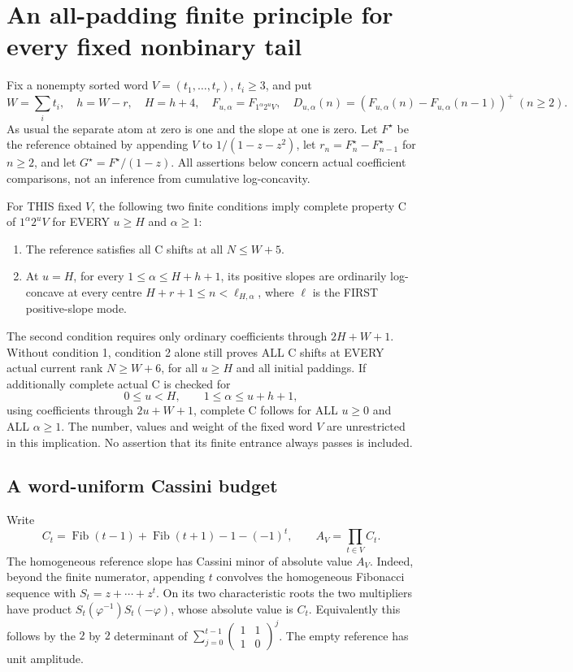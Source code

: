 \section{An all-padding finite principle for every fixed nonbinary tail}
Fix a nonempty sorted word $V=(t_1,\ldots,t_r)$, $t_i\ge3$, and put
\[
 W=\sum_i t_i,\quad h=W-r,\quad H=h+4,\quad
 F_{u,\alpha}=F_{1^\alpha2^u V},\quad
 D_{u,\alpha}(n)=(F_{u,\alpha}(n)-F_{u,\alpha}(n-1))^+\ (n\ge2).
\]
As usual the separate atom at zero is one and the slope at one is zero.
Let $F^\star$ be the reference obtained by appending $V$ to
$1/(1-z-z^2)$, let $r_n=F^\star_n-F^\star_{n-1}$ for $n\ge2$,
and let $G^\star=F^\star/(1-z)$. All assertions below concern actual
coefficient comparisons, not an inference from cumulative log-concavity.

\begin{theorem}
For THIS fixed $V$, the following two finite conditions imply complete
property C of $1^\alpha2^uV$ for EVERY $u\ge H$ and $\alpha\ge1$:
\begin{enumerate}
\item The reference satisfies all C shifts at all $N\le W+5$.
\item At $u=H$, for every $1\le\alpha\le H+h+1$, its positive slopes
      are ordinarily log-concave at every centre
      $H+r+1\le n<\ell_{H,\alpha}$, where $\ell$ is the FIRST
      positive-slope mode.
\end{enumerate}
The second condition requires only ordinary coefficients through
$2H+W+1$. Without condition 1, condition 2 alone still proves ALL C
shifts at EVERY actual current rank $N\ge W+6$, for all $u\ge H$
and all initial paddings.
If additionally complete actual C is checked for
\[
 0\le u<H,\qquad 1\le\alpha\le u+h+1,
\]
using coefficients through $2u+W+1$, complete C follows for ALL
$u\ge0$ and ALL $\alpha\ge1$. The number, values and weight of the
fixed word $V$ are unrestricted in this implication. No assertion
that its finite entrance always passes is included.
\end{theorem}

\subsection*{A word-uniform Cassini budget}
Write
\[
 C_t=\operatorname{Fib}(t-1)+\operatorname{Fib}(t+1)-1-(-1)^t,
 \qquad A_V=\prod_{t\in V} C_t.
\]
The homogeneous reference slope has Cassini minor of absolute value
$A_V$. Indeed, beyond the finite numerator, appending $t$ convolves
the homogeneous Fibonacci sequence with $S_t=z+\cdots+z^t$.
On its two characteristic roots the two multipliers have product
$S_t(\varphi^{-1})S_t(-\varphi)$, whose absolute value is $C_t$.
Equivalently this follows by the $2$ by $2$ determinant of
$\sum_{j=0}^{t-1}\begin{pmatrix}1&1\\1&0\end{pmatrix}^j$.
The empty reference has unit amplitude.

